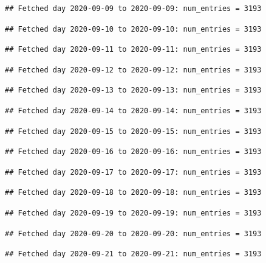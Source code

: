 \documentclass[]{article}
\begin{document}
\begin{verbatim}
## Fetched day 2020-09-09 to 2020-09-09: num_entries = 3193
\end{verbatim}

\begin{verbatim}
## Fetched day 2020-09-10 to 2020-09-10: num_entries = 3193
\end{verbatim}

\begin{verbatim}
## Fetched day 2020-09-11 to 2020-09-11: num_entries = 3193
\end{verbatim}

\begin{verbatim}
## Fetched day 2020-09-12 to 2020-09-12: num_entries = 3193
\end{verbatim}

\begin{verbatim}
## Fetched day 2020-09-13 to 2020-09-13: num_entries = 3193
\end{verbatim}

\begin{verbatim}
## Fetched day 2020-09-14 to 2020-09-14: num_entries = 3193
\end{verbatim}

\begin{verbatim}
## Fetched day 2020-09-15 to 2020-09-15: num_entries = 3193
\end{verbatim}

\begin{verbatim}
## Fetched day 2020-09-16 to 2020-09-16: num_entries = 3193
\end{verbatim}

\begin{verbatim}
## Fetched day 2020-09-17 to 2020-09-17: num_entries = 3193
\end{verbatim}

\begin{verbatim}
## Fetched day 2020-09-18 to 2020-09-18: num_entries = 3193
\end{verbatim}

\begin{verbatim}
## Fetched day 2020-09-19 to 2020-09-19: num_entries = 3193
\end{verbatim}

\begin{verbatim}
## Fetched day 2020-09-20 to 2020-09-20: num_entries = 3193
\end{verbatim}

\begin{verbatim}
## Fetched day 2020-09-21 to 2020-09-21: num_entries = 3193
\end{verbatim}
\end{document}
